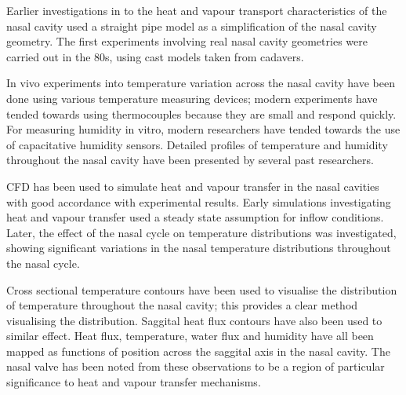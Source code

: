 Earlier investigations in to the heat and vapour transport characteristics of the nasal cavity used a straight pipe model as a simplification of the nasal cavity geometry\cite{Ingelstedt1961}. The first experiments involving real nasal cavity geometries were carried out in the 80s, using cast models taken from cadavers\cite{Nuckols1983}.

In vivo experiments into temperature variation across the nasal cavity have been done using various temperature measuring devices; modern experiments have tended towards using thermocouples because they are small and respond quickly\cite{Elad2008}. For measuring humidity in vitro, modern researchers have tended towards the use of capacitative humidity sensors\cite{Keck2000}. Detailed profiles of temperature and humidity throughout the nasal cavity have been presented by several past researchers\cite{Keck2000}.

CFD has been used to simulate heat and vapour transfer in the nasal cavities with good accordance with experimental results\cite{Lindemann2004}. Early simulations investigating heat and vapour transfer used a steady state assumption for inflow conditions\cite{Naftali1998}. Later, the effect of the nasal cycle on temperature distributions was investigated, showing significant variations in the nasal temperature distributions throughout the nasal cycle\cite{Elad2006}.

Cross sectional temperature contours have been used to visualise the distribution of temperature throughout the nasal cavity; this provides a clear method visualising the distribution\cite{Naftali2005}. Saggital heat flux contours have also been used to similar effect\cite{Sullivan2013}. Heat flux, temperature, water flux and humidity have all been mapped as functions of position across the saggital axis in the nasal cavity\cite{Garcia2007, Sullivan2013, Yu2014}. The nasal valve has been noted from these observations to be a region of particular significance to heat and vapour transfer mechanisms\cite{Sullivan2013}. 




